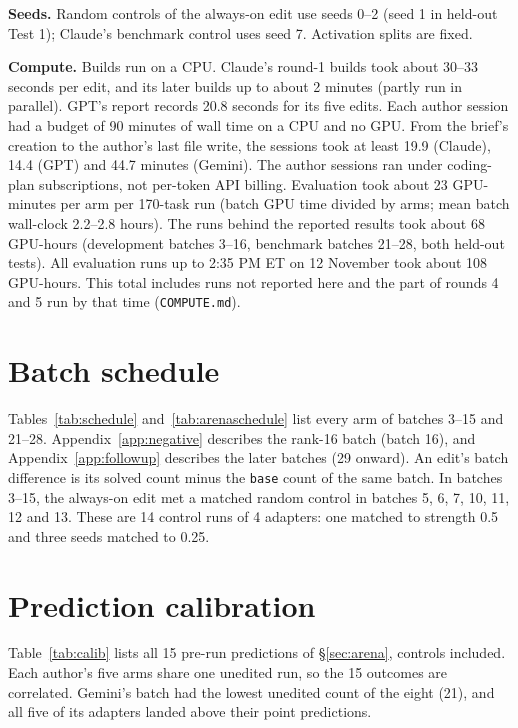 \textbf{Seeds.} Random controls of the always-on edit use seeds 0--2 (seed 1 in held-out Test 1); Claude's benchmark control uses seed 7. Activation splits are fixed.

\textbf{Compute.} Builds run on a CPU. Claude's round-1 builds took about 30--33 seconds per edit, and its later builds up to about 2 minutes (partly run in parallel). GPT's report records 20.8 seconds for its five edits. Each author session had a budget of 90 minutes of wall time on a CPU and no GPU. From the brief's creation to the author's last file write, the sessions took at least 19.9 (Claude), 14.4 (GPT) and 44.7 minutes (Gemini). The author sessions ran under coding-plan subscriptions, not per-token API billing. Evaluation took about 23 GPU-minutes per arm per 170-task run (batch GPU time divided by arms; mean batch wall-clock 2.2--2.8 hours). The runs behind the reported results took about 68 GPU-hours (development batches 3--16, benchmark batches 21--28, both held-out tests). All evaluation runs up to 2:35 PM ET on 12 November took about 108 GPU-hours. This total includes runs not reported here and the part of rounds 4 and 5 run by that time (\texttt{COMPUTE.md}).

\section{Batch schedule}
\label{app:schedule}
Tables~\ref{tab:schedule} and~\ref{tab:arenaschedule} list every arm of batches 3--15 and 21--28. Appendix~\ref{app:negative} describes the rank-16 batch (batch 16), and Appendix~\ref{app:followup} describes the later batches (29 onward). An edit's batch difference is its solved count minus the \texttt{base} count of the same batch. In batches 3--15, the always-on edit met a matched random control in batches 5, 6, 7, 10, 11, 12 and 13. These are 14 control runs of 4 adapters: one matched to strength 0.5 and three seeds matched to 0.25.



\section{Prediction calibration}
\label{app:calib}
Table~\ref{tab:calib} lists all 15 pre-run predictions of \S\ref{sec:arena}, controls included. Each author's five arms share one unedited run, so the 15 outcomes are correlated. Gemini's batch had the lowest unedited count of the eight (21), and all five of its adapters landed above their point predictions.

